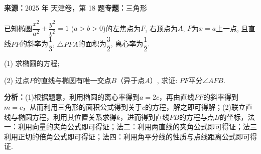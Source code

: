 \begin{question}[points=15]
\textbf{来源：}2025 年 天津卷，第 18 题\quad \textbf{专题：}三角形\par
已知椭圆$\dfrac{x^2}{a^2} + \dfrac{y^2}{b^2} = 1$ ($a > b > 0$)的左焦点为$F$, 右顶点为$A$, $P$为$x = a$上一点, 且直线$PF$的斜率为$\dfrac{1}{3}$, $\triangle PFA$的面积为$\dfrac{3}{2}$, 离心率为$\dfrac{1}{2}$.

(1) 求椭圆的方程;

(2) 过点$P$的直线与椭圆有唯一交点$B$（异于点$A$）, 求证: $PF$平分$\angle AFB$.
\begin{solution}

\textbf{分析：}(1)根据题意，利用椭圆的离心率得到$a=2c$，再由直线$PF$的斜率得到$m=c$，从而利用三角形的面积公式得到关于$c$的方程，解之即可得解；(2)联立直线与椭圆方程，利用其位置关系求得$k$，进而得到直线$PB$的方程与点$B$的坐标，法一：利用向量的夹角公式即可得证；法二：利用两直线的夹角公式即可得证；法三利用正切的倍角公式即可得证；法四：利用角平分线的性质与点线距离公式即可得证.


\end{solution}
\end{question}
